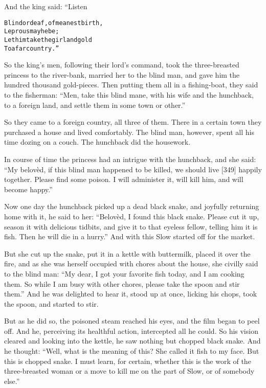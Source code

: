 \documentclass{article}
\renewenvironment{verbatim}{\begin{alltt}\normalfont\begin{centering}}{\end{centering}\end{alltt}}
\begin{document}
And the king said: “Listen

\begin{verbatim}
Blind or deaf, of meanest birth,
    Leprous may he be;
Let him take the girl and gold
    To a far country.”
\end{verbatim}
So the king's men, following their lord's command, took the
three-breasted princess to the river-bank, married her to the blind
man, and gave him the hundred thousand gold-pieces. Then putting
them all in a fishing-boat, they said to the fisherman:
``Men, take this blind mane, with his wife and the hunchback, to a foreign land, and settle them in some town or other.''

So they came to a foreign country, all three of them. There in a
certain town they purchased a house and lived comfortably. The
blind man, however, spent all his time dozing on a couch. The
hunchback did the housework.

In course of time the princess had an intrigue with the hunchback,
and she said:
``My belovèd, if this blind man happened to be killed, we should live [349] happily together. Please find some poison. I will administer it, will kill him, and will become happy.''

Now one day the hunchback picked up a dead black snake, and
joyfully returning home with it, he said to her:
``Belovèd, I found this black snake. Please cut it up, season it with delicious tidbits, and give it to that eyeless fellow, telling him it is fish. Then he will die in a hurry.''
And with this Slow started off for the market.

But she cut up the snake, put it in a kettle with buttermilk,
placed it over the fire, and as she was herself occupied with
chores about the house, she civilly said to the blind man:
``My dear, I got your favorite fish today, and I am cooking them. So while I am busy with other chores, please take the spoon and stir them.''
And he was delighted to hear it, stood up at once, licking his
chops, took the spoon, and started to stir.

But as he did so, the poisoned steam reached his eyes, and the film
began to peel off. And he, perceiving its healthful action,
intercepted all he could. So his vision cleared and looking into
the kettle, he saw nothing but chopped black snake. And he thought:
``Well, what is the meaning of this? She called it fish to my face. But this is chopped snake. I must learn, for certain, whether this is the work of the three-breasted woman or a move to kill me on the part of Slow, or of somebody else.''
\end{document}
